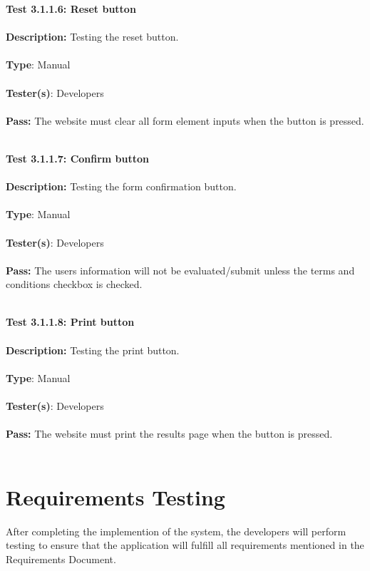 \documentclass[12pt]{article}
\begin{document}
\begin{tcolorbox}
\textbf{Test 3.1.1.6: Reset button} \\ \\
\textbf{Description:} Testing the reset button.  \\ \\
\textbf{Type}: Manual \\ \\
\textbf{Tester(s)}: Developers \\ \\
\textbf{Pass:} The website must clear all form element inputs when the button is pressed. \\ \\
\end{tcolorbox}

\begin{tcolorbox}
\textbf{Test 3.1.1.7: Confirm button} \\ \\
\textbf{Description:} Testing the form confirmation button. \\ \\
\textbf{Type}: Manual \\ \\
\textbf{Tester(s)}: Developers \\ \\
\textbf{Pass:} The user\textquotesingle s information will not be evaluated/submit unless the terms and conditions checkbox is checked. \\ \\
\end{tcolorbox}

\begin{tcolorbox}
\textbf{Test 3.1.1.8: Print button} \\ \\
\textbf{Description:} Testing the print button.  \\ \\
\textbf{Type}: Manual \\ \\
\textbf{Tester(s)}: Developers \\ \\
\textbf{Pass:} The website must print the results page when the button is pressed. \\ \\
\end{tcolorbox}

\section{Requirements Testing}
After completing the implemention of the system, the developers will perform testing to ensure that the application will fulfill all requirements mentioned in the Requirements Document.
\end{document}
